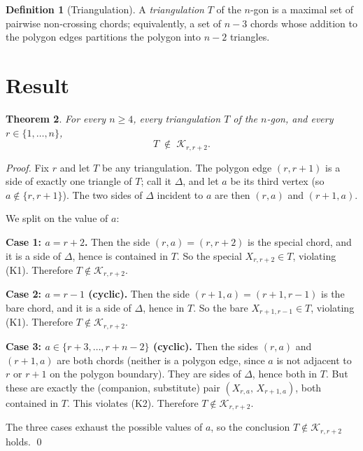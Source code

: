 \documentclass[11pt]{article}
\newtheorem{thm}{Theorem}
\theoremstyle{definition}
\newtheorem{defn}[thm]{Definition}
\begin{document}
\begin{defn}[Triangulation]
A \emph{triangulation} $T$ of the $n$-gon is a maximal set of pairwise
non-crossing chords; equivalently, a set of $n{-}3$ chords whose
addition to the polygon edges partitions the polygon into $n{-}2$
triangles.
\end{defn}

\section{Result}

\begin{thm}\label{thm:main}
For every $n\ge 4$, every triangulation $T$ of the $n$-gon, and every
$r\in\{1,\dots,n\}$,
\[
   T \;\notin\; \mathcal K_{r,r+2}.
\]
\end{thm}

\begin{proof}
Fix $r$ and let $T$ be any triangulation. The polygon edge $(r,r{+}1)$
is a side of exactly one triangle of $T$; call it $\Delta$, and let $a$
be its third vertex (so $a\notin\{r,r{+}1\}$). The two sides of $\Delta$
incident to $a$ are then $(r,a)$ and $(r{+}1,a)$.

We split on the value of $a$:

\smallskip\noindent
\textbf{Case 1: $a = r{+}2$.} Then the side $(r,a)=(r,r{+}2)$ is the
special chord, and it is a side of $\Delta$, hence is contained in $T$.
So the special $X_{r,r+2}\in T$, violating (K1). Therefore
$T\notin\mathcal K_{r,r+2}$.

\smallskip\noindent
\textbf{Case 2: $a = r{-}1$ (cyclic).} Then the side $(r{+}1,a) =
(r{+}1,r{-}1)$ is the bare chord, and it is a side of $\Delta$, hence
in $T$. So the bare $X_{r+1,r-1}\in T$, violating (K1). Therefore
$T\notin\mathcal K_{r,r+2}$.

\smallskip\noindent
\textbf{Case 3: $a\in\{r{+}3,\dots,r{+}n{-}2\}$ (cyclic).} Then the
sides $(r,a)$ and $(r{+}1,a)$ are both chords (neither is a polygon
edge, since $a$ is not adjacent to $r$ or $r{+}1$ on the polygon
boundary). They are sides of $\Delta$, hence both in $T$. But these are
exactly the (companion, substitute) pair
$(X_{r,a},\,X_{r+1,a})$, both contained in $T$. This violates (K2).
Therefore $T\notin\mathcal K_{r,r+2}$.

The three cases exhaust the possible values of $a$, so the conclusion
$T\notin\mathcal K_{r,r+2}$ holds. \qed
\end{proof}
\end{document}
